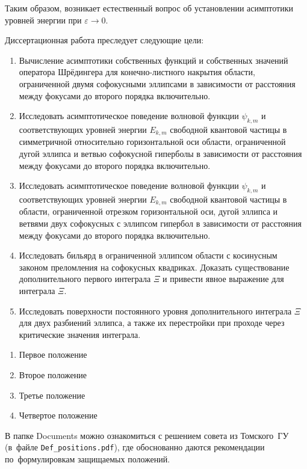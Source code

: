 Таким образом, возникает естественный вопрос об установлении асимптотики уровней энергии при $\varepsilon\to 0$. 

{\aim} 
Диссертационная работа преследует следующие цели:
\begin{enumerate}[beginpenalty=10000] %
  \item Вычисление асимптотики собственных функций и собственных значений оператора Шрёдингера для конечно-листного накрытия области, ограниченной двумя софокусными эллипсами в зависимости от расстояния между фокусами до второго порядка включительно.
  \item Исследовать асимптотическое поведение волновой функции $\psi_{k,m}$ и соответствующих уровней энергии $E_{k,m}$ свободной квантовой частицы в симметричной относительно горизонтальной оси области, ограниченной дугой эллипса и ветвью софокусной  гиперболы в зависимости от расстояния между фокусами до второго порядка включительно.
 \item Исследовать асимптотическое поведение волновой функции $\psi_{k,m}$ и соответствующих уровней энергии $E_{k,m}$ свободной квантовой частицы в области, ограниченной отрезком горизонтальной оси, дугой эллипса и ветвями двух софокусных с эллипсом гипербол в зависимости от расстояния между фокусами до второго порядка включительно.
  \item Исследовать бильярд в ограниченной эллипсом области с косинусным законом преломления на софокусных квадриках. Доказать существование дополнительного первого интеграла  $\Xi$ и привести явное выражение для интеграла $\Xi$.
  \item Исследовать поверхности постоянного уровня дополнительного интеграла $\Xi$ для двух разбиений эллипса, а также их перестройки при проходе через критические значения интеграла.
\end{enumerate}


{}
\begin{enumerate}[beginpenalty=10000] %
  \item Первое положение
  \item Второе положение
  \item Третье положение
  \item Четвертое положение
\end{enumerate}
В папке Documents можно ознакомиться с решением совета из Томского~ГУ
(в~файле \verb+Def_positions.pdf+), где обоснованно даются рекомендации
по~формулировкам защищаемых положений.


